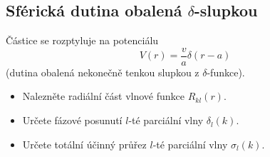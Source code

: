 \subsection{Sférická dutina obalená $\delta$-slupkou} %
	Částice se rozptyluje na potenciálu
	\begin{equation}
		V(r)
			=\frac{v}{a}\delta(r-a)
	\end{equation}
	(dutina obalená nekonečně tenkou slupkou z $\delta$-funkce).
	
	\begin{itemize}
		\item 
			Nalezněte radiální část vlnové funkce $R_{kl}(r)$.
			
		\item
			Určete fázové posunutí $l$-té parciální vlny $\delta_{l}(k)$.
			
		\item
			Určete totální účinný průřez $l$-té parciální vlny $\sigma_{l}(k)$.
	\end{itemize}

